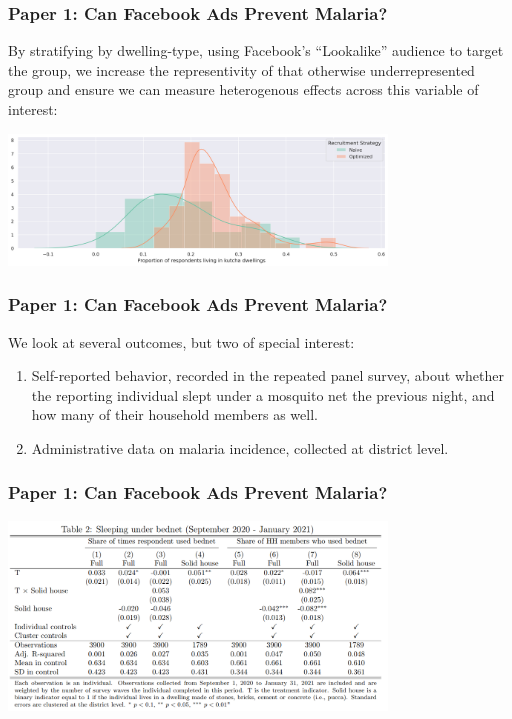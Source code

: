 \documentclass[aspectratio=169]{beamer}
\begin{document}
\begin{frame}
\frametitle{Paper 1: Can Facebook Ads Prevent Malaria?}

By stratifying by dwelling-type, using Facebook's ``Lookalike'' audience to target the group, we increase the representivity of that otherwise underrepresented group and ensure we can measure heterogenous effects across this variable of interest: 

\includegraphics[width=380px]{resources/optimization-kutcha-proportion.png} 
  
\end{frame}


\begin{frame}
\frametitle{Paper 1: Can Facebook Ads Prevent Malaria?}

We look at several outcomes, but two of special interest: 

\begin{enumerate}
\item Self-reported behavior, recorded in the repeated panel survey, about whether the reporting individual slept under a mosquito net the previous night, and how many of their household members as well. 
\item Administrative data on malaria incidence, collected at district level. 
\end{enumerate}
  
\end{frame}

\begin{frame}
\frametitle{Paper 1: Can Facebook Ads Prevent Malaria?}

\includegraphics[width=380px]{resources/sleeping-panel-regression.png} 
  
\end{frame}
\end{document}
